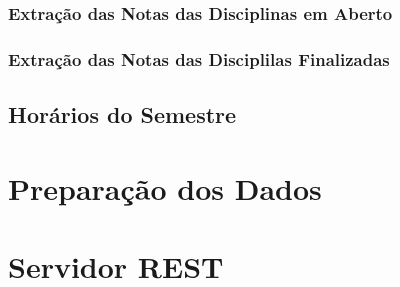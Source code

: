 \subsubsection{Extração das Notas das Disciplinas em Aberto}

\subsubsection{Extração das Notas das Disciplilas Finalizadas}

\subsection{Horários do Semestre}


\section{Preparação dos Dados}

\section{Servidor REST}
